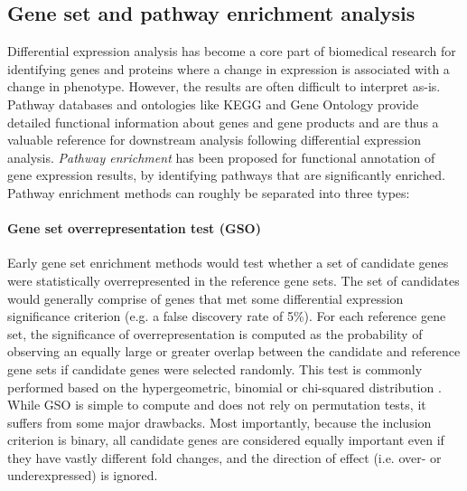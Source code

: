 \subsection{Gene set and pathway enrichment analysis}
\label{sec:genesetenrichment}
Differential expression analysis has become a core part of biomedical research for identifying genes and proteins where a change in expression is associated with a change in phenotype. However, the results are often difficult to interpret as-is. Pathway databases and ontologies like KEGG and Gene Ontology provide detailed functional information about genes and gene products and are thus a valuable reference for downstream analysis following differential expression analysis. \emph{Pathway enrichment} has been proposed for functional annotation of gene expression results, by identifying pathways that are significantly enriched. Pathway enrichment methods can roughly be separated into three types:

\paragraph{Gene set overrepresentation test (GSO)}
Early gene set enrichment methods would test whether a set of candidate genes were statistically overrepresented in the reference gene sets. The set of candidates would generally comprise of genes that met some differential expression significance criterion (e.g. a false discovery rate of 5\%). For each reference gene set, the significance of overrepresentation is computed as the probability of observing an equally large or greater overlap between the candidate and reference gene sets if candidate genes were selected randomly. This test is commonly performed based on the hypergeometric, binomial or chi-squared distribution \cite{Huang2008}.
While GSO is simple to compute and does not rely on permutation tests, it suffers from some major drawbacks. Most importantly, because the inclusion criterion is binary, all candidate genes are considered equally important even if they have vastly different fold changes, and the direction of effect (i.e. over- or underexpressed) is ignored.

